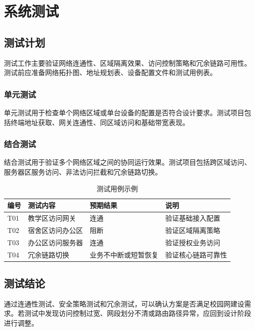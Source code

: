 \chapter{系统测试}

\section{测试计划}

测试工作主要验证网络连通性、区域隔离效果、访问控制策略和冗余链路可用性。测试前应准备网络拓扑图、地址规划表、设备配置文件和测试用例表。

\subsection{单元测试}

单元测试用于检查单个网络区域或单台设备的配置是否符合设计要求。测试项目包括终端地址获取、网关连通性、同区域访问和基础带宽表现。

\subsection{结合测试}

结合测试用于验证多个网络区域之间的协同运行效果。测试项目包括跨区域访问、服务器区服务访问、非法访问拦截和冗余链路切换。

\begin{table}[htbp]
  \centering
  \caption{测试用例示例}
  \label{tab:test-case}
  \begin{tabularx}{0.88\textwidth}{lllX}
    \toprule
    编号 & 测试内容 & 预期结果 & 说明 \\
    \midrule
    T01 & 教学区访问网关 & 连通 & 验证基础接入配置 \\
    T02 & 宿舍区访问办公区 & 阻断 & 验证区域隔离策略 \\
    T03 & 办公区访问服务器 & 连通 & 验证授权业务访问 \\
    T04 & 冗余链路切换 & 业务不中断或短暂恢复 & 验证核心链路可靠性 \\
    \bottomrule
  \end{tabularx}
\end{table}

\section{测试结论}

通过连通性测试、安全策略测试和冗余测试，可以确认方案是否满足校园网建设需求。若测试中发现访问控制过宽、网段划分不清或路由路径异常，应回到设计阶段进行调整。
